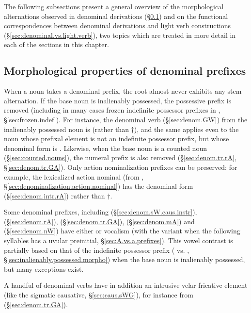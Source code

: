  The following subsections present a general overview of the morphological alternations observed in denominal derivations (§\ref{sec:denominal.prefixes.morph}) and on the functional correspondences between denominal derivations and light verb constructions (§\ref{sec:denominal.vs.light.verb}), two topics which are treated in more detail in each of the sections in this chapter.
 
\subsection{Morphological properties of denominal prefixes} \label{sec:denominal.prefixes.morph}
When a noun takes a denominal prefix, the root almost never exhibits any stem alternation. If the base noun is  inalienably possessed, the possessive prefix is removed (including in many cases frozen indefinite possessor prefixes in , §\ref{sec:frozen.indef}). For instance, the  denominal verb (§\ref{sec:denom.GW}) from the inalienably possessed noun  is   (rather than $\dagger$), and the same applies even to the noun  whose  prefixal element is not an indefinite possessor prefix, but whose denominal form is  . Likewise, when the base noun is a counted noun (§\ref{sec:counted.nouns}), the numeral prefix is also removed (§\ref{sec:denom.tr.rA}, §\ref{sec:denom.tr.GA}). Only action nominalization  prefixes can be preserved: for example, the lexicalized action nominal  (from , §\ref{sec:denominalization.action.nominal}) has the denominal form  (§\ref{sec:denom.intr.rA}) rather than $\dagger$.

Some denominal prefixes, including  (§\ref{sec:denom.sW.caus.instr}),   (§\ref{sec:denom.rA}),  (§\ref{sec:denom.tr.GA}),  (§\ref{sec:denom.mA}) and  (§\ref{sec:denom.nW}) have either  or   vocalism (with the variant  when the following syllables has a uvular preinitial, §\ref{sec:A.vs.a.prefixes}). This vowel contrast is partially based on that of the indefinite possessor prefix ( vs. , §\ref{sec:inalienably.possessed.morpho}) when the base noun is  inalienably possessed, but many exceptions exist. 

A handful of denominal verbs have in addition an intrusive  velar fricative element (like the sigmatic causative, §\ref{sec:caus.sWG}), for instance  from   (§\ref{sec:denom.tr.GA}).
 
